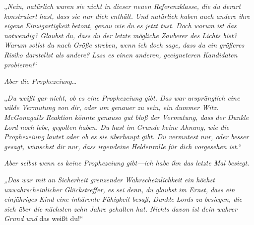 „\emph{Nein, natürlich waren sie nicht in dieser neuen Referenzklasse, die du derart konstruiert hast, dass sie nur dich enthält. Und natürlich haben auch andere ihre eigene Einzigartigkeit betont, genau wie du es jetzt tust. Doch warum ist das notwendig? Glaubst du, dass du der letzte mögliche Zauberer des Lichts bist? Warum sollst \emph{du} nach Größe streben, wenn ich doch sage, dass du ein größeres Risiko darstellst als andere? Lass es einen anderen, geeigneteren Kandidaten probieren!}“

\emph{Aber die Prophezeiung…}

„\emph{Du weißt gar nicht, ob es eine Prophezeiung gibt. Das war ursprünglich eine wilde Vermutung von dir, oder um genauer zu sein, ein dummer Witz. McGonagalls Reaktion könnte genauso gut bloß der Vermutung, dass der Dunkle Lord noch lebe, gegolten haben. Du hast im Grunde keine Ahnung, wie die Prophezeiung lautet oder ob es sie überhaupt \emph{gibt}. Du vermutest nur, oder besser gesagt, \emph{wünschst} dir nur, dass irgendeine Heldenrolle für dich vorgesehen ist.}“

\emph{Aber selbst wenn es keine Prophezeiung gibt—ich habe ihn das letzte Mal besiegt. }

\emph{„Das war mit an Sicherheit grenzender Wahrscheinlichkeit ein höchst unwahrscheinlicher Glückstreffer, es sei denn, du glaubst im Ernst, dass ein einjähriges Kind eine inhärente Fähigkeit besaß, Dunkle Lords zu besiegen, die sich über die nächsten zehn Jahre gehalten hat. Nichts davon ist dein wahrer Grund und} das weißt du!“

